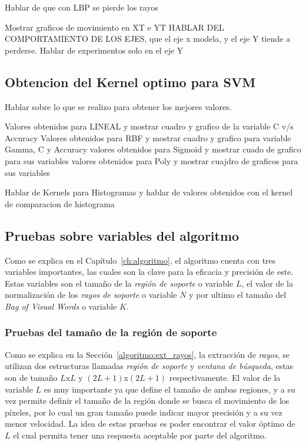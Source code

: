 Hablar de que con LBP se pierde los rayos

Mostrar graficos de movimiento en XT e YT
HABLAR DEL COMPORTAMIENTO DE LOS EJES, que el eje x modela, y el eje Y tiende a perderse.
Hablar de experimentos solo en el eje Y


\subsection{Obtencion del Kernel optimo para SVM}

Hablar sobre lo que se realizo para obtener los mejores valores.

Valores obtenidos para LINEAL y mostrar cuadro y grafico de la variable C v/s Accuracy
Valores obtenidos para RBF y mostrar cuadro y grafico para variable Gamma, C y Accuracy
valores obtenidos para Sigmoid y mostrar cuado de grafico para sus variables
valores obtenidos para Poly y mostrar cuajdro de graficos para sus variables

Hablar de Kernels para Histogramas y hablar de valores obtenidos con el kernel de comparacion de histograma


\subsection{Pruebas sobre variables del algoritmo}
\label{exp:var}
Como se explica en el Capítulo~\ref{ch:algoritmo}, el algoritmo cuenta con tres variables importantes, las cuales son la clave para la eficacia y precisión de este. Estas variables son el tamaño de la \textit{región de soporte} o variable $L$, el valor de la normalización de los \textit{rayos de soporte} o variable $N$ y por ultimo el tamaño del \textit{Bag of Visual Words} o variable $K$.

\subsubsection{Pruebas del tamaño de la región de soporte}
Como se explica en la Sección~\ref{algoritmo:ext_rayos}, la extracción de \textit{rayos}, se utilizan dos estructuras llamadas \textit{región de soporte} y \textit{ventana de búsqueda}, estas son de tamaño $L$x$L$ y $(2L+1)$x$(2L+1)$ respectivamente. El valor de la variable $L$ es muy importante ya que define el tamaño de ambas regiones, y a su vez permite definir el tamaño de la región donde se busca el movimiento de los píxeles, por lo cual un gran tamaño puede indicar mayor precisión y a su vez menor velocidad. La idea de estas pruebas es poder encontrar el valor óptimo de $L$ el cual permita tener una respuesta aceptable por parte del algoritmo. 


